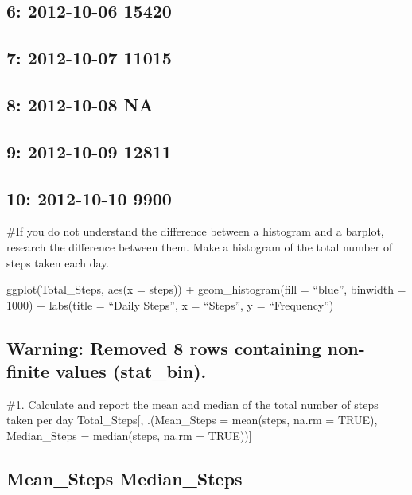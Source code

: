 \documentclass[
]{article}
\begin{document}
\hypertarget{section-4}{%
\subsection{6: 2012-10-06 15420}\label{section-4}}

\hypertarget{section-5}{%
\subsection{7: 2012-10-07 11015}\label{section-5}}

\hypertarget{na-1}{%
\subsection{8: 2012-10-08 NA}\label{na-1}}

\hypertarget{section-6}{%
\subsection{9: 2012-10-09 12811}\label{section-6}}

\hypertarget{section-7}{%
\subsection{10: 2012-10-10 9900}\label{section-7}}

\#If you do not understand the difference between a histogram and a
barplot, research the difference between them. Make a histogram of the
total number of steps taken each day.

ggplot(Total\_Steps, aes(x = steps)) + geom\_histogram(fill = ``blue'',
binwidth = 1000) + labs(title = ``Daily Steps'', x = ``Steps'', y =
``Frequency'')

\hypertarget{warning-removed-8-rows-containing-non-finite-values-stat_bin.}{%
\subsection{Warning: Removed 8 rows containing non-finite values
(stat\_bin).}\label{warning-removed-8-rows-containing-non-finite-values-stat_bin.}}

\#1. Calculate and report the mean and median of the total number of
steps taken per day Total\_Steps{[}, .(Mean\_Steps = mean(steps, na.rm =
TRUE), Median\_Steps = median(steps, na.rm = TRUE)){]}

\hypertarget{mean_steps-median_steps}{%
\subsection{Mean\_Steps Median\_Steps}\label{mean_steps-median_steps}}
\end{document}
